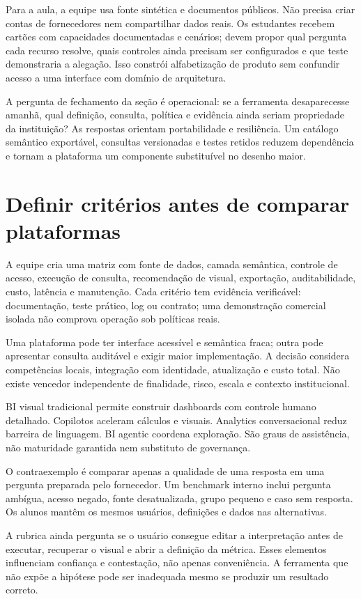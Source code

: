 Para a aula, a equipe usa fonte sintética e documentos públicos. Não precisa criar contas de fornecedores nem compartilhar dados reais. Os estudantes recebem cartões com capacidades documentadas e cenários; devem propor qual pergunta cada recurso resolve, quais controles ainda precisam ser configurados e que teste demonstraria a alegação. Isso constrói alfabetização de produto sem confundir acesso a uma interface com domínio de arquitetura.

A pergunta de fechamento da seção é operacional: se a ferramenta desaparecesse amanhã, qual definição, consulta, política e evidência ainda seriam propriedade da instituição? As respostas orientam portabilidade e resiliência. Um catálogo semântico exportável, consultas versionadas e testes retidos reduzem dependência e tornam a plataforma um componente substituível no desenho maior.

\section{Definir critérios antes de comparar plataformas}

A equipe cria uma matriz com fonte de dados, camada semântica, controle de acesso, execução de consulta, recomendação de visual, exportação, auditabilidade, custo, latência e manutenção. Cada critério tem evidência verificável: documentação, teste prático, log ou contrato; uma demonstração comercial isolada não comprova operação sob políticas reais.

Uma plataforma pode ter interface acessível e semântica fraca; outra pode apresentar consulta auditável e exigir maior implementação. A decisão considera competências locais, integração com identidade, atualização e custo total. Não existe vencedor independente de finalidade, risco, escala e contexto institucional.

BI visual tradicional permite construir dashboards com controle humano detalhado. Copilotos aceleram cálculos e visuais. Analytics conversacional reduz barreira de linguagem. BI agentic coordena exploração. São graus de assistência, não maturidade garantida nem substituto de governança.

O contraexemplo é comparar apenas a qualidade de uma resposta em uma pergunta preparada pelo fornecedor. Um benchmark interno inclui pergunta ambígua, acesso negado, fonte desatualizada, grupo pequeno e caso sem resposta. Os alunos mantêm os mesmos usuários, definições e dados nas alternativas.

A rubrica ainda pergunta se o usuário consegue editar a interpretação antes de executar, recuperar o visual e abrir a definição da métrica. Esses elementos influenciam confiança e contestação, não apenas conveniência. A ferramenta que não expõe a hipótese pode ser inadequada mesmo se produzir um resultado correto.

